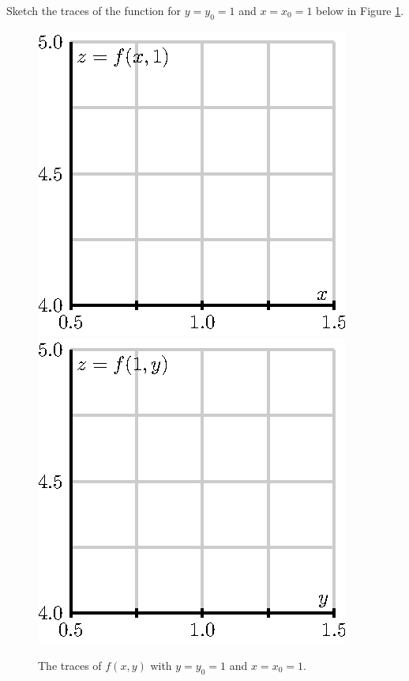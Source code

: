 \begin{pa}
\item Sketch the traces of the function for $y=y_0=1$ and $x=x_0=1$
  below in Figure \ref{F:10.4.traces}.  

  \begin{figure}[ht]
    \begin{center}
      \includegraphics{figures/fig_10_4_tangent_trace_y.eps}
      \hspace*{20pt}
      \includegraphics{figures/fig_10_4_tangent_trace_x.eps}
    \end{center}
    \caption{The traces of $f(x,y)$ with $y=y_0=1$ and $x=x_0=1$.}
    \label{F:10.4.traces}
  \end{figure}


\end{pa}
